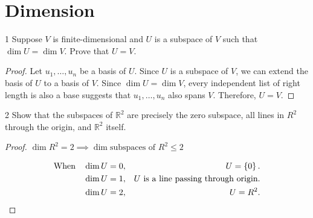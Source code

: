 \documentclass{extarticle}
\newenvironment{problem}[1]{\begin{prob*}{#1}{}}{\end{prob*}}
\newcommand{\R}{\mathbb{R}}
\begin{document}
\section{Dimension}

\begin{problem}{1}
Suppose $V$ is finite-dimensional and $U$ is a subspace of $V$ such that $ \dim U = \dim V$. Prove that $U = V$.
\end{problem}

\begin{proof}
Let \(u_1, \dots, u_n\) be a basis of $U$. Since $U$ is a subspace of $V$, we can extend the basis of $U$ to a basis of $V$.
Since \( \dim U = \dim V\), every independent list of right length is also a base suggests that \(u_{1}, \dots, u_{n}\) also spans $V$. Therefore, \(U = V\).
\end{proof}

\begin{problem}{2}
Show that the subspaces of $\R^2$ are precisely the zero subspace, all lines in $R^{2}$ through the origin, and $\R^2$ itself.
\end{problem}
\begin{proof}
\( \dim R^{2} = 2 \implies \dim \text{subspaces of } R^{2} \leq 2\)

\begin{align}
  \text{When} \hspace{10pt} &\dim U = 0,& U  = \set{0}.  \\
  &\dim U = 1,& U \text{ is a line passing through origin.}  \\
  &\dim U = 2,& U = R^{2}.
\end{align}



\end{proof}


\end{document}

